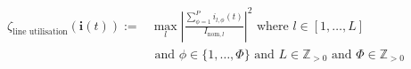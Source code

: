 \begin{equation}
\begin{split}
	\zeta_\text{line utilisation}(\textbf{i}(t)) :=& %
	\max_{l}{\left|\frac{\sum_{\phi=1}^{P}{i_{l,\phi}(t)}}{I_{\text{nom},l}}\right|^2}  \text{ where } l \in [1, \dots, L] \\
	&\text{ and } \phi \in \{1, \dots, \Phi\} \text{ and } L \in \mathbb{Z}_{>0} \text{ and } \Phi \in \mathbb{Z}_{>0}
\end{split}
\label{ch1:equ:line-utilisation}
\end{equation}